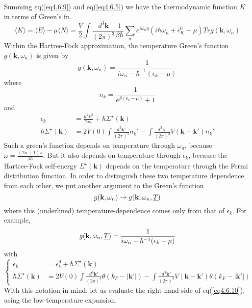 Summing eq(\ref{eq4.6.9}) and eq(\ref{eq4.6.5}) we have the thermodynamic function $K$ in terms of Green's fn.
\begin{equation}\label{eq4.6.10}
\langle K \rangle=\langle E \rangle-\mu\langle N \rangle=\frac{V}{2} \int \frac{d^3 \mathbf{k}}{(2\pi)^3} \frac{1}{\beta\hbar} \sum_n e^{i\omega_n \eta}\left(i\hbar\omega_n+\epsilon_K^0-\mu\right)Tr g(\mathbf{k},\omega_n)
\end{equation}
Within the Hartree-Fock approximation, the temperature Green's function $g(\mathbf{k},\omega_n)$ is given by
\begin{equation}
g(\mathbf{k},\omega_n)=\frac{1}{i\omega_n-\hbar^{-1}(\epsilon_k-\mu)}
\end{equation}
where 
\[
n_k=\frac{1}{e^{\beta(\epsilon_k-\mu)}+1}
\]
and
\[
\begin{aligned}
\epsilon_k&=\frac{\hbar^2 k^2}{2m}+\hbar\Sigma^\star(\mathbf{k})\\
\hbar \Sigma^\star(\mathbf{k})&=2V(0)\int\frac{d^3\mathbf{k}'}{(2\pi)^3}n_k'-\int\frac{d^3\mathbf{k}'}{(2\pi)^3}V(\mathbf{k}-\mathbf{k}')n_k'
\end{aligned}
\]
Such a green's function depends on temperature through $\omega_n$, because $\omega=\frac{(2n+1)\pi}{\beta\hbar}$.
But it also depends on temperature through $\epsilon_k$, because the Hartree-Fock self-energy $\Sigma^\star(\mathbf{k})$ depends on the temperature through the Fermi distribution function.
In order to distinguish these two temperature dependence from each other, we put another argument to the Green's function
\[
g(\mathbf{k},\omega_n)\to g(\mathbf{k},\omega_n,\uline{T})
\]
where this (underlined) temperature-dependence comes only from that of $\epsilon_k$.
For example,
\begin{equation}
g(\mathbf{k},\omega_n,\uline{T})=\frac{1}{i\omega_n-\hbar^{-1}(\epsilon_k-\mu)}
\end{equation}
with
\begin{equation}\tag{4.6.13$^\prime$}
\left\{
\begin{aligned}
\epsilon_k&=\epsilon_k^0+\hbar\Sigma^\star(\mathbf{k})\\
\hbar \Sigma^\star(\mathbf{k})&=2V(0)\int\frac{d^3\mathbf{k}'}{(2\pi)^3} \theta(k_F-|\mathbf{k}'|)-\int\frac{d^3\mathbf{k}'}{(2\pi)^3}V(\mathbf{k}-\mathbf{k}') \theta(k_F-|\mathbf{k}'|)
\end{aligned}
\right.
\end{equation}
With this notation in mind, let us evaluate the right-hand-side of eq(\ref{eq4.6.10}), using the low-temperature expansion.
